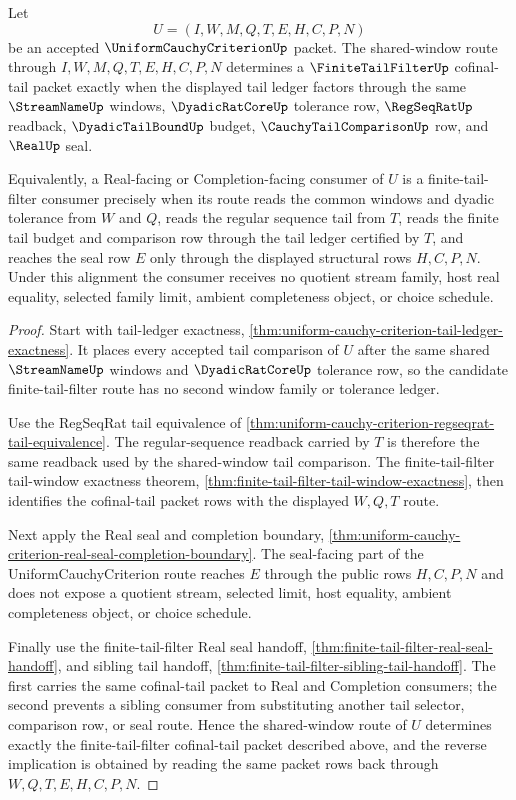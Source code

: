 \begin{theorem}
\label{thm:uniform-cauchy-criterion-finite-tail-filter-alignment}
Let
$$
U=(I,W,M,Q,T,E,H,C,P,N)
$$
be an accepted $\UniformCauchyCriterionUp$ packet. The shared-window route through $I,W,M,Q,T,E,H,C,P,N$ determines a $\FiniteTailFilterUp$ cofinal-tail packet exactly when the displayed tail ledger factors through the same $\StreamNameUp$ windows, $\DyadicRatCoreUp$ tolerance row, $\RegSeqRatUp$ readback, $\DyadicTailBoundUp$ budget, $\CauchyTailComparisonUp$ row, and $\RealUp$ seal.

Equivalently, a Real-facing or Completion-facing consumer of $U$ is a finite-tail-filter consumer precisely when its route reads the common windows and dyadic tolerance from $W$ and $Q$, reads the regular sequence tail from $T$, reads the finite tail budget and comparison row through the tail ledger certified by $T$, and reaches the seal row $E$ only through the displayed structural rows $H,C,P,N$. Under this alignment the consumer receives no quotient stream family, host real equality, selected family limit, ambient completeness object, or choice schedule.
\end{theorem}
\begin{proof}
Start with tail-ledger exactness, \autoref{thm:uniform-cauchy-criterion-tail-ledger-exactness}. It places every accepted tail comparison of $U$ after the same shared $\StreamNameUp$ windows and $\DyadicRatCoreUp$ tolerance row, so the candidate finite-tail-filter route has no second window family or tolerance ledger.

Use the RegSeqRat tail equivalence of \autoref{thm:uniform-cauchy-criterion-regseqrat-tail-equivalence}. The regular-sequence readback carried by $T$ is therefore the same readback used by the shared-window tail comparison. The finite-tail-filter tail-window exactness theorem, \autoref{thm:finite-tail-filter-tail-window-exactness}, then identifies the cofinal-tail packet rows with the displayed $W,Q,T$ route.

Next apply the Real seal and completion boundary, \autoref{thm:uniform-cauchy-criterion-real-seal-completion-boundary}. The seal-facing part of the UniformCauchyCriterion route reaches $E$ through the public rows $H,C,P,N$ and does not expose a quotient stream, selected limit, host equality, ambient completeness object, or choice schedule.

Finally use the finite-tail-filter Real seal handoff, \autoref{thm:finite-tail-filter-real-seal-handoff}, and sibling tail handoff, \autoref{thm:finite-tail-filter-sibling-tail-handoff}. The first carries the same cofinal-tail packet to Real and Completion consumers; the second prevents a sibling consumer from substituting another tail selector, comparison row, or seal route. Hence the shared-window route of $U$ determines exactly the finite-tail-filter cofinal-tail packet described above, and the reverse implication is obtained by reading the same packet rows back through $W,Q,T,E,H,C,P,N$.
\end{proof}

